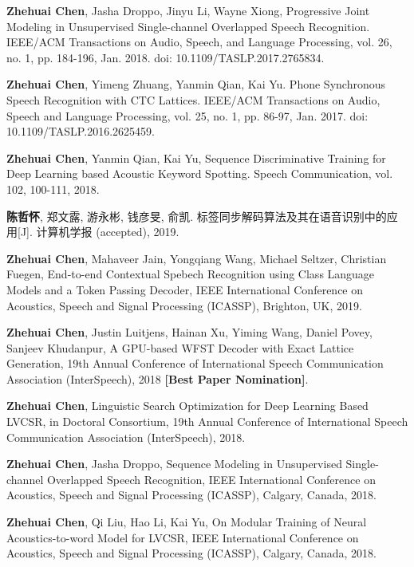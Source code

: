 
\begin{publications}{99}
 \item {\bf Zhehuai Chen}, Jasha Droppo, Jinyu Li, Wayne Xiong, Progressive Joint Modeling in Unsupervised Single-channel Overlapped Speech Recognition. IEEE/ACM Transactions on Audio, Speech, and Language Processing, vol. 26, no. 1, pp. 184-196, Jan. 2018. doi:  10.1109/TASLP.2017.2765834.
 \item {\bf Zhehuai Chen}, Yimeng Zhuang, Yanmin Qian, Kai Yu. Phone Synchronous Speech Recognition with CTC Lattices. IEEE/ACM Transactions on Audio, Speech and Language Processing, vol. 25, no. 1, pp. 86-97, Jan. 2017. doi: 10.1109/TASLP.2016.2625459.
  \item {\bf Zhehuai Chen}, Yanmin Qian, Kai Yu, Sequence Discriminative Training for Deep Learning based Acoustic Keyword Spotting. Speech Communication, vol. 102, 100-111, 2018.
  \item {\bf 陈哲怀}, 郑文露, 游永彬, 钱彦旻, 俞凯. 标签同步解码算法及其在语音识别中的应用[J]. 计算机学报 (accepted), 2019.
 \\
  \item {\bf Zhehuai Chen}, Mahaveer Jain, Yongqiang Wang, Michael Seltzer, Christian Fuegen, End-to-end Contextual Spebech Recognition using Class Language Models and a Token Passing Decoder, IEEE International Conference on Acoustics, Speech and Signal Processing (ICASSP), Brighton, UK, 2019.
  \item {\bf Zhehuai Chen}, Justin Luitjens, Hainan Xu, Yiming Wang, Daniel Povey, Sanjeev Khudanpur, A GPU-based WFST Decoder with Exact Lattice Generation,  19th Annual Conference of  International Speech Communication Association (InterSpeech), 2018 {\bf [Best Paper Nomination]}.
  \item {\bf Zhehuai Chen}, Linguistic Search Optimization for Deep Learning Based LVCSR, in Doctoral Consortium, 19th Annual Conference of  International Speech Communication Association (InterSpeech), 2018.
  \item {\bf Zhehuai Chen}, Jasha Droppo, Sequence Modeling in Unsupervised Single-channel Overlapped Speech Recognition,  IEEE International Conference on Acoustics, Speech and Signal Processing (ICASSP), Calgary, Canada, 2018.
  \item {\bf Zhehuai Chen}, Qi Liu, Hao Li, Kai Yu, On Modular Training of Neural Acoustics-to-word Model for LVCSR,  IEEE International Conference on Acoustics, Speech and Signal Processing (ICASSP), Calgary, Canada, 2018.

\end{publications}

